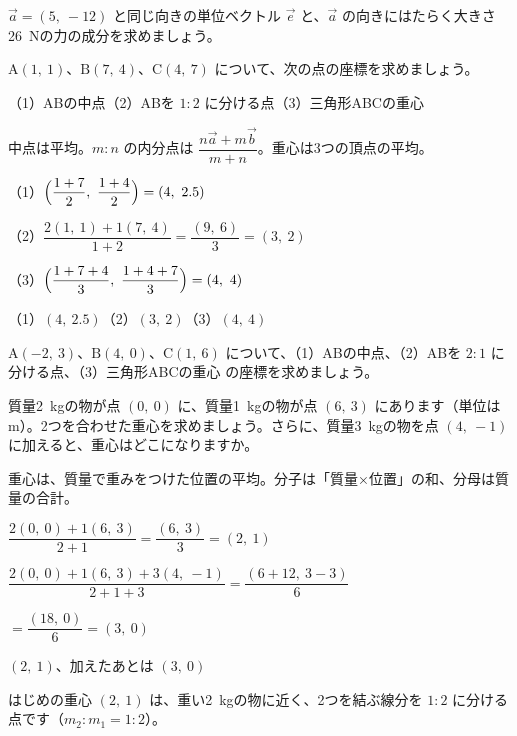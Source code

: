 \begin{jibun}
$\vec{a}=(5,\ -12)$ と同じ向きの単位ベクトル $\vec{e}$ と、$\vec{a}$ の向きにはたらく大きさ\qty{26}{N}の力の成分を求めましょう。
\end{jibun}

\begin{reidai}[中点・内分点・重心]
$\mathrm{A}(1,\ 1)$、$\mathrm{B}(7,\ 4)$、$\mathrm{C}(4,\ 7)$ について、次の点の座標を求めましょう。\par
（1）ABの中点\quad（2）ABを $1:2$ に分ける点\quad（3）三角形ABCの重心\par
\kangaekata 中点は平均。$m:n$ の内分点は $\dfrac{n\vec{a}+m\vec{b}}{m+n}$。重心は3つの頂点の平均。\par
\shiki（1）$\Bigl(\dfrac{1+7}{2},\ \dfrac{1+4}{2}\Bigr)=(4,\ 2.5)$\par
\hspace*{2.6\zw}（2）$\dfrac{2(1,\ 1)+1(7,\ 4)}{1+2}=\dfrac{(9,\ 6)}{3}=(3,\ 2)$\par
\hspace*{2.6\zw}（3）$\Bigl(\dfrac{1+7+4}{3},\ \dfrac{1+4+7}{3}\Bigr)=(4,\ 4)$\par
\kotae （1）$(4,\ 2.5)$\quad（2）$(3,\ 2)$\quad（3）$(4,\ 4)$
\end{reidai}

\begin{jibun}
$\mathrm{A}(-2,\ 3)$、$\mathrm{B}(4,\ 0)$、$\mathrm{C}(1,\ 6)$ について、（1）ABの中点、（2）ABを $2:1$ に分ける点、（3）三角形ABCの重心 の座標を求めましょう。
\end{jibun}

\begin{reidai}[質量のちがう物の重心]
質量\qty{2}{kg}の物が点 $(0,\ 0)$ に、質量\qty{1}{kg}の物が点 $(6,\ 3)$ にあります（単位はm）。2つを合わせた重心を求めましょう。さらに、質量\qty{3}{kg}の物を点 $(4,\ -1)$ に加えると、重心はどこになりますか。\par
\kangaekata 重心は、質量で重みをつけた位置の平均。分子は「質量×位置」の和、分母は質量の合計。\par
\shiki $\dfrac{2(0,\ 0)+1(6,\ 3)}{2+1}=\dfrac{(6,\ 3)}{3}=(2,\ 1)$\par\vspace{2pt}
\hspace*{2.6\zw}$\dfrac{2(0,\ 0)+1(6,\ 3)+3(4,\ -1)}{2+1+3}=\dfrac{(6+12,\ 3-3)}{6}$\par\vspace{2pt}
\hspace*{4.6\zw}$=\dfrac{(18,\ 0)}{6}=(3,\ 0)$\par
\kotae $(2,\ 1)$、加えたあとは $(3,\ 0)$
\end{reidai}
はじめの重心 $(2,\ 1)$ は、重い\qty{2}{kg}の物に近く、2つを結ぶ線分を $1:2$ に分ける点です（$m_2:m_1=1:2$）。

